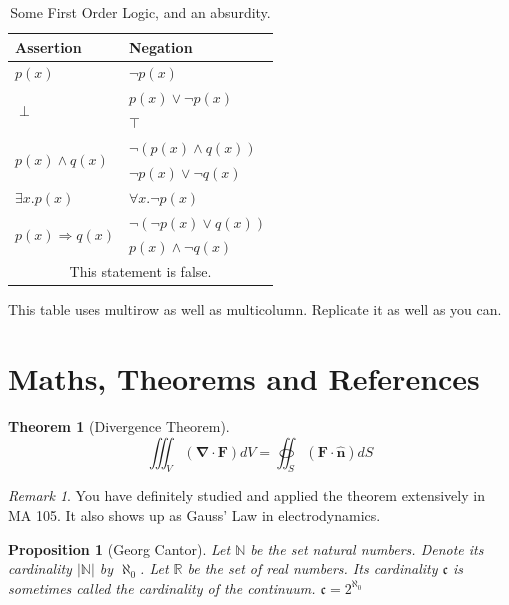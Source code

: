 \documentclass[]{article}
\newtheorem{theorem}{Theorem}
\newtheorem{proposition}{Proposition}[section]
\theoremstyle{remark}
\newtheorem*{remark}{Remark}
\begin{document}
\begin{table}[H]
    \centering
    \begin{tabular}{p{3.7 cm}|p{3.7 cm}}
         \hline
         \textbf{Assertion} & \textbf{Negation} \\
         \hline
         $p(x)$ & $\neg{p(x)}$ \\
         \hline
         \multirow{2}{*}{$\perp$} & $p(x) \vee \neg p(x)$ \\
         & $\top$ \\
         \hline
         \multirow{2}{*}{$p(x) \wedge q(x)$} & $\neg (p(x) \wedge q(x))$ \\ 
         & $\neg p(x) \vee \neg q(x)$ \\
         \hline
         $\exists x.p(x)$ & $\forall x. \neg p(x)$\\
         \hline
         \multirow{2}{*}{$p(x) \Rightarrow q(x)$} & $\neg (\neg p(x) \lor q(x))$ \\
         & $p(x) \land \neg q(x)$\\
         \hline
         \multicolumn{2}{c}{This statement is false.} \\
         \hline
    \end{tabular}
    \caption{Some First Order Logic, and an absurdity.}
    \label{tab:my_label}
\end{table}

This table uses multirow as well as multicolumn. Replicate it as well as you can.

\newpage

\section{Maths, Theorems and References}

\begin{theorem}[Divergence Theorem]
\begin{equation*}
    \iiint_V (\boldsymbol{\nabla} \cdot \mathbf{F}) dV = \oiint_S (\mathbf{F} \cdot \mathbf{\hat{n}}) dS
\end{equation*}
\end{theorem}

\begin{remark}
You have definitely studied and applied the theorem extensively in
MA 105. It also shows up as Gauss’ Law in electrodynamics.
\end{remark}

\begin{proposition}[Georg Cantor]
Let $\mathbb{N}$ be the set natural numbers. Denote its cardinality $|\mathbb{N}|$ by $\aleph_0$. Let $\mathbb{R}$ be the set of real numbers. Its cardinality $\mathfrak{c}$ is sometimes called the cardinality of the continuum. $\mathfrak{c} = 2^{\aleph_0}$ 
\end{proposition}
\end{document}
